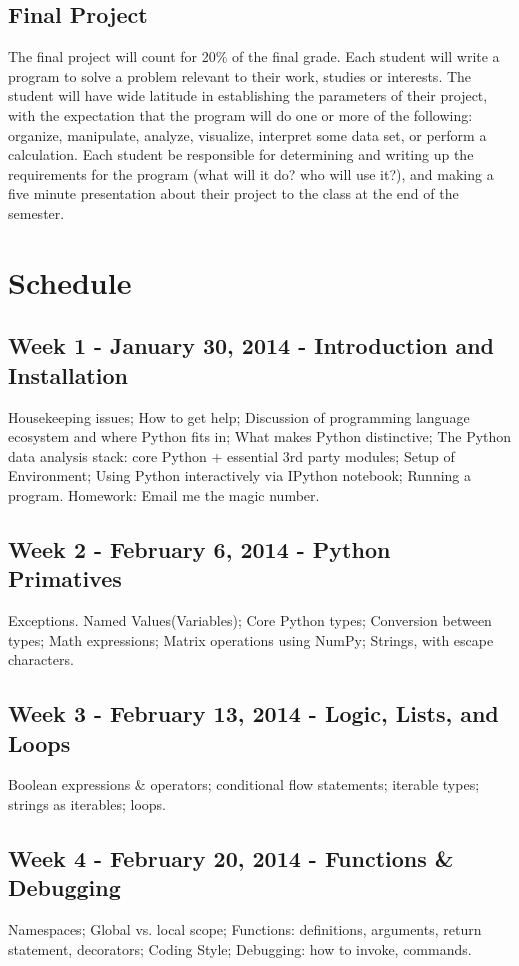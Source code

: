 \documentclass{article}
\begin{document}
\subsection{Final Project}
The final project will count for 20\% of the final grade. Each student will write a program to solve a problem relevant to their work, studies or interests. The student will have wide latitude in establishing the parameters of their project, with the expectation that the program will do one or more of the following: organize, manipulate, analyze, visualize, interpret some data set, or perform a calculation. Each student be responsible for determining and writing up the requirements for the program (what will it do? who will use it?), and making a five minute presentation about their project to the class at the end of the semester.
\section{Schedule}  
\subsection*{Week 1 - January 30, 2014 - Introduction and Installation}
Housekeeping issues; How to get help; Discussion of programming language ecosystem and where Python fits in; What makes Python distinctive; The Python data analysis stack: core Python + essential 3rd party modules; Setup of Environment; Using Python interactively via IPython notebook; Running a program. Homework: Email me the magic number.
\subsection*{Week 2 - February 6, 2014 - Python Primatives}
Exceptions. Named Values(Variables); Core Python types; Conversion between types; Math expressions; Matrix operations using NumPy; Strings, with escape characters.
\subsection*{Week 3 - February 13, 2014 - Logic, Lists, and Loops}
Boolean expressions \& operators; conditional flow statements; iterable types; strings as iterables; loops. 
\subsection*{Week 4 - February 20, 2014 - Functions \& Debugging}
Namespaces; Global vs. local scope; Functions: definitions, arguments, return statement, decorators;  Coding Style; Debugging: how to invoke, commands.
\end{document}
